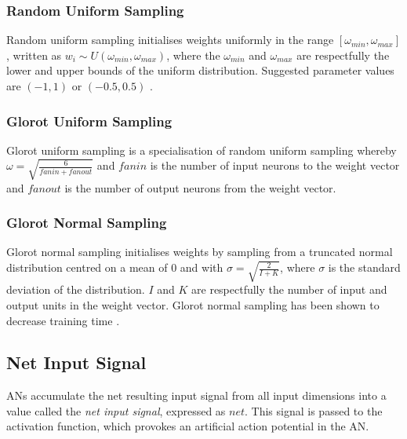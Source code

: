 \subsubsection{Random Uniform Sampling}\label{sec:anns:an:weights:random_uniform_sampling}

Random uniform sampling initialises weights uniformly in the range $[\omega_{min}, \omega_{max}]$, written as $w_{i} \sim \textit{U} (\omega_{min}, \omega_{max})$, where the $\omega_{min}$ and $\omega_{max}$ are respectfully the lower and upper bounds of the uniform distribution. Suggested parameter values are $(-1, 1)$ or $(-0.5, 0.5)$ \cite{ref:nguyen:1990}.


\subsubsection{Glorot Uniform Sampling}\label{sec:anns:an:weights:glorot_uniform_sampling}

Glorot uniform sampling is a specialisation of random uniform sampling whereby $\omega = \sqrt{\frac{6}{fanin + fanout}}$ and $fanin$ is the number of input neurons to the weight vector and $fanout$ is the number of output neurons from the weight vector.

\subsubsection{Glorot Normal Sampling}\label{sec:anns:an:weights:glorot_normal_sampling}

Glorot normal sampling initialises weights by sampling from a truncated normal distribution centred on a mean of $0$ and with $\sigma = \sqrt{\frac{2}{I + K}}$, where $\sigma$ is the standard deviation of the distribution. $I$ and $K$ are respectfully the number of input and output units in the weight vector. Glorot normal sampling has been shown to decrease training time \cite{ref:glorot:2010}.


\subsection{Net Input Signal}\label{sec:anns:an:net_input}

\acp{AN} accumulate the net resulting input signal from all input dimensions into a value called the \textit{net input signal}, expressed as $net$. This signal is passed to the activation function, which provokes an artificial action potential in the \ac{AN}.


